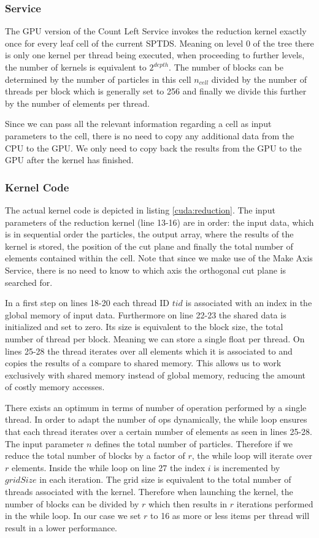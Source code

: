 \documentclass[]{article}
\begin{document}
\subsubsection{Service}

The GPU version of the Count Left Service invokes the reduction kernel exactly once for every leaf cell of the current SPTDS. Meaning on level 0 of the tree there is only one kernel per thread being executed, when proceeding to further levels, the number of kernels is equivalent to $2^{depth}$. 
The number of blocks can be determined by the number of particles in this cell $n_{cell}$ divided by the number of threads per block which is generally set to 256 and finally we divide this further by the number of elements per thread. 

Since we can pass all the relevant information regarding a cell as input parameters to the cell, there is no need to copy any additional data from the CPU to the GPU. We only need to copy back the results from the GPU to the GPU after the kernel has finished.

\subsubsection{Kernel Code}\label{sec:countleftcode}
The actual kernel code is depicted in listing \ref{cuda:reduction}. The input parameters of the reduction kernel (line 13-16) are in order: the input data, which is in sequential order the particles, the output array, where the results of the kernel is stored, the position of the cut plane and finally the total number of elements contained within the cell. Note that since we make use of the Make Axis Service, there is no need to know to which axis the orthogonal cut plane is searched for. 

In a first step on lines 18-20 each thread ID $tid$ is associated with an index in the global memory of input data. Furthermore on line 22-23 the shared data is initialized and set to zero. Its size is equivalent to the block size, the total number of thread per block. Meaning we can store a single float per thread. On lines 25-28 the thread iterates over all elements which it is associated to and copies the results of a compare to shared memory. This allows us to work exclusively with shared memory instead of global memory, reducing the amount of costly memory accesses.

There exists an optimum in terms of number of operation performed by a single thread. In order to adapt the number of ops dynamically, the while loop ensures that each thread iterates over a certain number of elements as seen in lines 25-28. The input parameter $n$ defines the total number of particles. Therefore if we reduce the total number of blocks by a factor of $r$, the while loop will iterate over $r$ elements. Inside the while loop on line 27 the index $i$ is incremented by $gridSize$ in each iteration. The grid size is equivalent to the total number of threads associated with the kernel. Therefore when launching the kernel, the number of blocks can be divided by $r$ which then results in $r$ iterations performed in the while loop. In our case we set $r$ to 16 as more or less items per thread will result in a lower performance.
\end{document}
